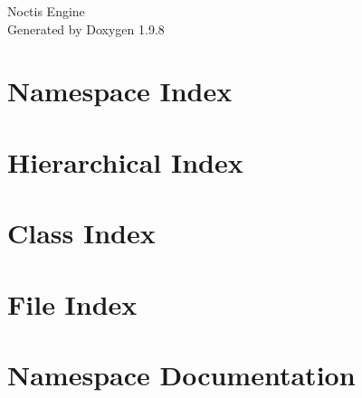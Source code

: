 \documentclass[twoside]{book}
\newcommand{\+}{\discretionary{\mbox{\scriptsize$\hookleftarrow$}}{}{}}
\newcommand{\clearemptydoublepage}{%
    \newpage{\pagestyle{empty}\cleardoublepage}%
  }
\begin{document}
  \raggedbottom
    \hypersetup{pageanchor=false,
                bookmarksnumbered=true,
                pdfencoding=unicode
               }
  \begin{titlepage}
  \vspace*{7cm}
  \begin{center}%
  {\Large Noctis Engine}\\
  \vspace*{1cm}
  {\large Generated by Doxygen 1.9.8}\\
  \end{center}
  \end{titlepage}
  \clearemptydoublepage
  \tableofcontents
  \clearemptydoublepage
  \hypersetup{pageanchor=true}

\chapter{Namespace Index}

\chapter{Hierarchical Index}

\chapter{Class Index}

\chapter{File Index}

\chapter{Namespace Documentation}








\end{document}
